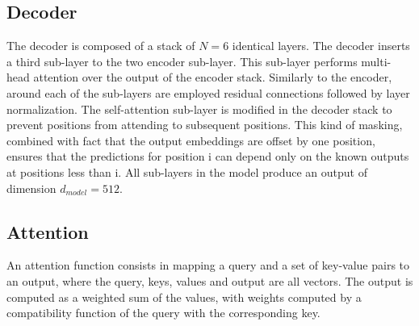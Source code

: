 \documentclass[\main/main.tex]{subfiles}
\begin{document}
\subsection{Decoder}
The decoder is composed of a stack of $N=6$ identical layers. The decoder inserts a third sub-layer to the two encoder sub-layer. This sub-layer performs multi-head attention over the output of the encoder stack. Similarly to the encoder, around each of the sub-layers are employed residual connections followed by layer normalization. The self-attention sub-layer is modified in the decoder stack to prevent positions from attending to subsequent positions. This kind of masking, combined with fact that the output embeddings are offset by one position, ensures that the predictions for position i can depend only on the known outputs at positions less than i. All sub-layers in the model produce an output of dimension $d_{model} = 512$.

\subsection{Attention}
An attention function consists in mapping a query and a set of key-value pairs to an output, where the query, keys, values and output are all vectors. The output is computed as a weighted sum of the values, with weights computed by a compatibility function of the query with the corresponding key.
\end{document}
